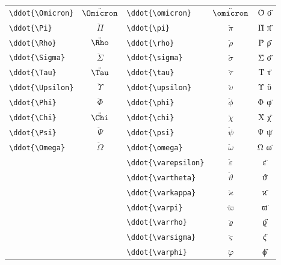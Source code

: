 \documentclass[12pt,a4paper]{article}
\begin{document}
\begin{longtable}{|l|c|l|c|c|}
\verb|\ddot{\Omicron}|    & $\ddot{\Omicron}$ & \verb|\ddot{\omicron}|    & $\ddot{\omicron}$    & Ο̈ ο̈ \\
\verb|\ddot{\Pi}|         & $\ddot{\Pi}$      & \verb|\ddot{\pi}|         & $\ddot{\pi}$         & Π̈ π̈ \\
\verb|\ddot{\Rho}|        & $\ddot{\Rho}$     & \verb|\ddot{\rho}|        & $\ddot{\rho}$        & Ρ̈ ρ̈ \\
\verb|\ddot{\Sigma}|      & $\ddot{\Sigma}$   & \verb|\ddot{\sigma}|      & $\ddot{\sigma}$      & Σ̈ σ̈ \\
\verb|\ddot{\Tau}|        & $\ddot{\Tau}$     & \verb|\ddot{\tau}|        & $\ddot{\tau}$        & Τ̈ τ̈ \\
\verb|\ddot{\Upsilon}|    & $\ddot{\Upsilon}$ & \verb|\ddot{\upsilon}|    & $\ddot{\upsilon}$    & Ϋ ϋ \\
\verb|\ddot{\Phi}|        & $\ddot{\Phi}$     & \verb|\ddot{\phi}|        & $\ddot{\phi}$        & Φ̈ φ̈ \\
\verb|\ddot{\Chi}|        & $\ddot{\Chi}$     & \verb|\ddot{\chi}|        & $\ddot{\chi}$        & Χ̈ χ̈ \\
\verb|\ddot{\Psi}|        & $\ddot{\Psi}$     & \verb|\ddot{\psi}|        & $\ddot{\psi}$        & Ψ̈ ψ̈ \\
\verb|\ddot{\Omega}|      & $\ddot{\Omega}$   & \verb|\ddot{\omega}|      & $\ddot{\omega}$      & Ω̈ ω̈ \\
                          &                   & \verb|\ddot{\varepsilon}| & $\ddot{\varepsilon}$ & ε̈ \\
                          &                   & \verb|\ddot{\vartheta}|   & $\ddot{\vartheta}$   & ϑ̈ \\
                          &                   & \verb|\ddot{\varkappa}|   & $\ddot{\varkappa}$   & ϰ̈ \\
                          &                   & \verb|\ddot{\varpi}|      & $\ddot{\varpi}$      & ϖ̈ \\
                          &                   & \verb|\ddot{\varrho}|     & $\ddot{\varrho}$     & ϱ̈ \\
                          &                   & \verb|\ddot{\varsigma}|   & $\ddot{\varsigma}$   & ς̈ \\
                          &                   & \verb|\ddot{\varphi}|     & $\ddot{\varphi}$     & ϕ̈ \\
\hline
\end{longtable}
\end{document}
